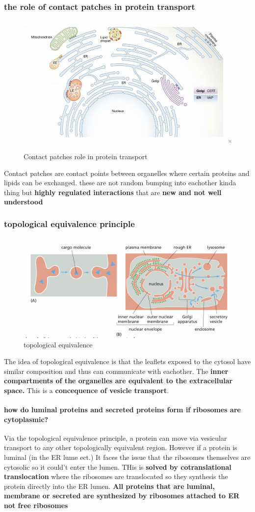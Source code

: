 \documentclass[../main.tex]{subfiles}
\begin{document}
\subsubsection{the role of contact patches in protein transport}
\begin{figure}[H]
    \centering
    \includegraphics[width=0.5\linewidth]{Sum_Cell_Bio_II//lectures//cbII4/contact.png}
    \caption{Contact patches role in protein transport}
    \label{fig:enter-label}
\end{figure}
Contact patches are contact points between organelles where certain proteins and lipids can be exchanged. these are not random bumping into eachother kinda thing but \textbf{highly regulated interactions} that are \textbf{new and not well understood}

\subsubsection{topological equivalence principle}
\begin{figure}[H]
    \centering
    \includegraphics[width=0.5\linewidth]{Sum_Cell_Bio_II//lectures//cbII4/topologicalEquivalence.png}
    \caption{topological equivalence}
    \label{fig:enter-label}
\end{figure}
The idea of topological equivalence is that the leaflets exposed to the cytosol have similar composition and thus can communicate with eachother. The \textbf{inner compartments of the organelles are equivalent to the extracellular space.} This is a \textbf{concequence of vesicle transport}.
\par
\paragraph{how do luminal proteins and secreted proteins form if ribosomes are cytoplasmic?}
Via the topological equivalence principle, a protein can move via vesicular transport to any other topologically equivalent region. However if a protein is luminal (in the ER lume ect.) It faces the issue that the ribosomes themselves are cytosolic so it could't enter the lumen. THis is\textbf{ solved by cotranslational translocation} where the ribosomes are translocated so they synthesis the protein directly into the ER lumen. \textbf{All proteins that are luminal, membrane or secreted are synthesized by ribosomes attached to ER not free ribosomes}
\end{document}
